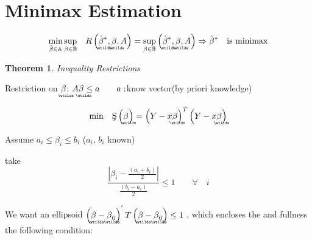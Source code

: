 \documentclass{article}
\newtheorem{theorem}{Theorem}
\begin{document}
\section{Minimax Estimation}

\begin{equation}
\underset{\hat{\beta}\in \mathbb{A}}{\min }\,\underset{\beta \in \mathbb{B}}{%
\sup }\quad R\left( \underaccent{\wtilde}{\hat{\beta}}^{\ast },%
\underaccent{\wtilde}{\beta},A\right) =\underset{\beta \in \mathbb{B}}{\sup }%
\left( \underaccent{\wtilde}{\hat{\beta}}^{\ast },\underaccent{\wtilde}{%
\beta},A\right) \Rightarrow \hat{\beta}^{\ast }\text{ is minimax}
\end{equation}

\bigskip

\begin{theorem}
Inequality Restrictions
\end{theorem}

Restriction on $\underaccent{\wtilde}{\beta}$: $A\underaccent{\wtilde}{\beta}%
\leq a\qquad a:$know vector(by priori knowledge)

\begin{equation}
\min \,\text{\c{S}}\left( \underaccent{\wtilde}{\beta}\right) =\left( Y-x%
\underaccent{\wtilde}{\beta}\right) ^{T}\left( Y-x\underaccent{\wtilde}{%
\beta}\right)
\end{equation}

Assume $a_{i}\leq \beta _{i}\leq b_{i}$ ($a_{i}$, $b_{i}$ known)

take%
\begin{equation}
\frac{\left\vert \beta _{i}-\frac{\left( a_{i}+b_{i}\right) }{2}\right\vert 
}{\frac{\left( b_{i}-a_{i}\right) }{2}}\leq 1\qquad \forall \quad i
\end{equation}

We want an ellipsoid $\left( \underaccent{\wtilde}{\beta}-%
\underaccent{\wtilde}{\beta}_{0}\right) ^{^{\prime }}T\left( %
\underaccent{\wtilde}{\beta}-\underaccent{\wtilde}{\beta}_{0}\right) \leq 1$%
, which encloses the and fullness the following condition:
\end{document}

